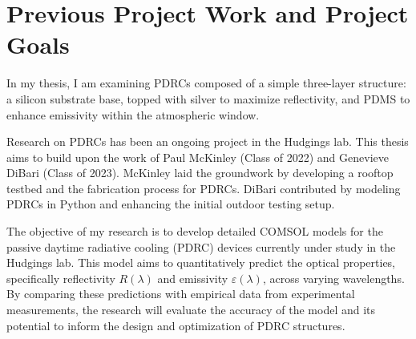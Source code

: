 \section{Previous Project Work and Project Goals}
In my thesis, I am examining PDRCs composed of a simple three-layer structure: a silicon substrate base, topped with silver to maximize reflectivity, and PDMS to enhance emissivity within the atmospheric window.

Research on PDRCs has been an ongoing project in the Hudgings lab. This thesis aims to build upon the work of Paul McKinley (Class of 2022) and Genevieve DiBari (Class of 2023). McKinley laid the groundwork by developing a rooftop testbed and the fabrication process for PDRCs. DiBari contributed by modeling PDRCs in Python and enhancing the initial outdoor testing setup.

The objective of my research is to develop detailed COMSOL models for the passive daytime radiative cooling (PDRC) devices currently under study in the Hudgings lab. This model aims to quantitatively predict the optical properties, specifically reflectivity $R(\lambda)$ and emissivity $\varepsilon(\lambda)$, across varying wavelengths. By comparing these predictions with empirical data from experimental measurements, the research will evaluate the accuracy of the model and its potential to inform the design and optimization of PDRC structures.
